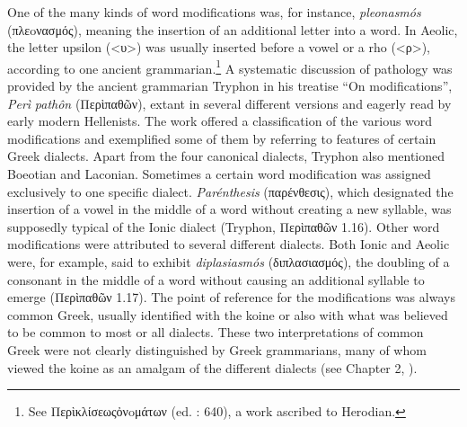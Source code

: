 One of the many kinds of word modifications was, for instance, \textit{pleonasmós} (πλεoνασμός), meaning the insertion of an additional letter into a word. In Aeolic, the letter upsilon (<υ>) was usually inserted before a vowel or a rho (<ρ>), according to one ancient grammarian.\footnote{ \textrm{See Περὶκλίσεωςὀνoμάτων (ed. \citealt{Lentz1870}: 640), a work ascribed to Herodian.}} A systematic discussion of pathology was provided by the ancient grammarian Tryphon in his treatise “On modifications”, \textit{Perì} \textit{pathôn} (Περὶπαθῶν), extant in several different versions and eagerly read by early modern Hellenists. The work offered a classification of the various word modifications and exemplified some of them by referring to features of certain Greek dialects. Apart from the four canonical dialects, Tryphon also mentioned Boeotian and Laconian. Sometimes a certain word modification was assigned exclusively to one specific dialect. \textit{Parénthesis} (παρένθεσις), which designated the insertion of a vowel in the middle of a word without creating a new syllable, was supposedly typical of the Ionic dialect (Tryphon, Περὶπαθῶν 1.16). Other word modifications were attributed to several different dialects. Both Ionic and Aeolic were, for example, said to exhibit \textit{diplasiasmós} (διπλασιασμός), the doubling of a consonant in the middle of a word without causing an additional syllable to emerge (Περὶπαθῶν 1.17). The point of reference for the modifications was always common Greek, usually identified with the koine or also with what was believed to be common to most or all dialects. These two interpretations of common Greek were not clearly distinguished by Greek grammarians, many of whom viewed the koine as an amalgam of the different dialects (see Chapter 2, ).



